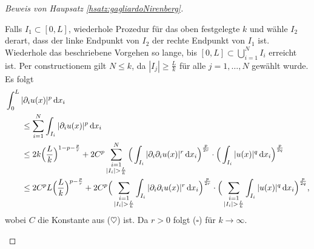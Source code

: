 \begin{proof}[Beweis von Haupsatz \ref{hsatz:gagliardoNirenberg}]
\begin{enumerate}
      Falls $I_1 \subset [0,L]$, wiederhole Prozedur für das oben festgelegte $k$ und wähle $I_2$ derart, dass der linke Endpunkt von $I_2$ der rechte Endpunkt von $I_1$ ist.
      Wiederhole das beschriebene Vorgehen so lange, bis $[0,L] \subset \bigcup_{i = 1}^N I_i$ erreicht ist.
      Per constructionem gilt $N \leq k$, da $|I_j| \geq \frac{L}{k}$ für alle $j = 1,\dots,N$ gewählt wurde.
      Es folgt
      \begin{align*}
        &\int_0^L |\partial_i u(x)|^p \, {\operatorname{d}\!{x}}_i \\
        &\qquad\leq \sum_{i = 1}^N \int_{I_i} |\partial_i u(x)|^p \, {\operatorname{d}\!{x}}_i \\ 
        &\qquad\leq 2k \Big( \frac{L}{k} \Big)^{1 - p - \frac{p}{r}} + 2C^p \sum_{\substack{i = 1 \\ |I_i| > \frac{L}{k}}}^N \Big( \int_{I_i} |\partial_i \partial_i u(x)|^r \, {\operatorname{d}\!{x}}_i \Big)^{\frac{p}{2r}} \cdot \Big( \int_{I_i} |u(x)|^q \, {\operatorname{d}\!{x}}_i \Big)^{\frac{p}{2q}} \\
        &\qquad\leq 2C^p L \Big(\frac{L}{k}\Big)^{p - \frac{p}{r}} + 2C^p \Big( \sum_{\substack{i = 1 \\ |I_i| > \frac{L}{k}}} \int_{I_i} |\partial_i \partial_i u(x)|^r \, {\operatorname{d}\!{x}}_i \Big)^{\frac{p}{2r}} \cdot \Big( \sum_{\substack{i = 1 \\ |I_i| > \frac{L}{k}}} \int_{I_i} |u(x)|^q \, {\operatorname{d}\!{x}}_i \Big)^{\frac{p}{2q}},
      \end{align*}
      wobei $C$ die Konstante aus ($\heartsuit$) ist.
      Da $r > 0$ folgt ($\square$) für $k \to \infty$.


\end{enumerate}
\end{proof}
